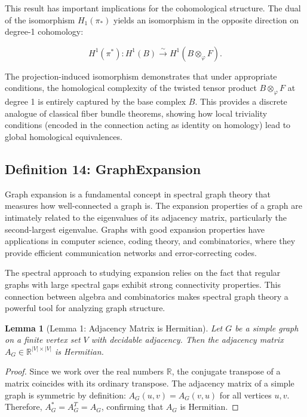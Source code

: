 \documentclass[11pt]{article}
\theoremstyle{plain}
\newtheorem*{lemma}{Lemma}
\theoremstyle{definition}
\theoremstyle{remark}
\begin{document}
This result has important implications for the cohomological structure. The dual of the isomorphism $H_1(\pi_*)$ yields an isomorphism in the opposite direction on degree-1 cohomology:

\[
H^1(\pi^*) : H^1(B) \xrightarrow{\sim} H^1(B \otimes_\varphi F).
\]

The projection-induced isomorphism demonstrates that under appropriate conditions, the homological complexity of the twisted tensor product $B \otimes_\varphi F$ at degree 1 is entirely captured by the base complex $B$. This provides a discrete analogue of classical fiber bundle theorems, showing how local triviality conditions (encoded in the connection acting as identity on homology) lead to global homological equivalences.

\vspace{1em}

\subsection{Definition 14: GraphExpansion}

Graph expansion is a fundamental concept in spectral graph theory that measures how well-connected a graph is. The expansion properties of a graph are intimately related to the eigenvalues of its adjacency matrix, particularly the second-largest eigenvalue. Graphs with good expansion properties have applications in computer science, coding theory, and combinatorics, where they provide efficient communication networks and error-correcting codes.

The spectral approach to studying expansion relies on the fact that regular graphs with large spectral gaps exhibit strong connectivity properties. This connection between algebra and combinatorics makes spectral graph theory a powerful tool for analyzing graph structure.

\begin{lemma}[Lemma 1: Adjacency Matrix is Hermitian]
Let $G$ be a simple graph on a finite vertex set $V$ with decidable adjacency. Then the adjacency matrix $A_G \in \mathbb{R}^{|V| \times |V|}$ is Hermitian.
\end{lemma}

\begin{proof}
Since we work over the real numbers $\mathbb{R}$, the conjugate transpose of a matrix coincides with its ordinary transpose. The adjacency matrix of a simple graph is symmetric by definition: $A_G(u,v) = A_G(v,u)$ for all vertices $u, v$. Therefore, $A_G^* = A_G^T = A_G$, confirming that $A_G$ is Hermitian.
\end{proof}
\end{document}
